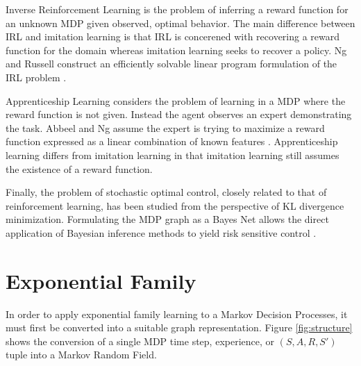 \documentclass{article} %
\begin{document}
Inverse Reinforcement Learning is the problem of inferring a reward function for an unknown MDP given observed, optimal behavior. The main difference between IRL and imitation learning is that IRL is concerened with recovering a reward function for the domain whereas imitation learning seeks to recover a policy. Ng and Russell construct an efficiently solvable linear program formulation of the IRL problem \cite{ng00}. 

Apprenticeship Learning considers the problem of learning in a MDP where the reward function is not given. Instead the agent observes an expert demonstrating the task. Abbeel and Ng assume the expert is trying to maximize a reward function expressed as a linear combination of known features \cite{abbeel04}. Apprenticeship learning differs from imitation learning in that imitation learning still assumes the existence of a reward function.

Finally, the problem of stochastic optimal control, closely related to that of reinforcement learning, has been studied from the perspective of KL divergence minimization. Formulating the MDP graph as a Bayes Net allows the direct application of Bayesian inference methods to yield risk sensitive control \cite{rawlik10,tousaint06}.

\section{Exponential Family}
In order to apply exponential family learning to a Markov Decision Processes, it must first be converted into a suitable graph representation. Figure \ref{fig:structure} shows the conversion of a single MDP time step, experience, or $(S,A,R,S')$ tuple into a Markov Random Field. 
\end{document}
